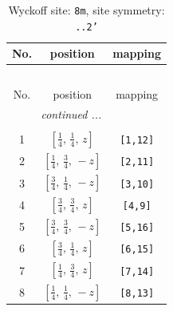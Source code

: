 \documentclass[fleqn,8pt]{jsarticle}
\begin{document}
\renewcommand{\arraystretch}{1.2}
\begin{longtable}{ccc}
\caption{Wyckoff site: {\tt 8m}, site symmetry: {\tt ..2'}}
 \\
 \hline \hline
No. & position & mapping \\ \hline \endfirsthead

\multicolumn{2}{l}{\tablename\ \thetable{}} \\
 \hline \hline
No. & position & mapping \\ \hline \endhead

 \hline \hline
\multicolumn{2}{r}{\footnotesize\it continued ...} \\ \endfoot

 \hline \hline
\multicolumn{2}{r}{} \\ \endlastfoot

1 & $\left[ \frac{1}{4},\, \frac{1}{4},\, z \right]$ & {\tt [1,12]} \\ \hline
2 & $\left[ \frac{1}{4},\, \frac{3}{4},\, - z \right]$ & {\tt [2,11]} \\ \hline
3 & $\left[ \frac{3}{4},\, \frac{1}{4},\, - z \right]$ & {\tt [3,10]} \\ \hline
4 & $\left[ \frac{3}{4},\, \frac{3}{4},\, z \right]$ & {\tt [4,9]} \\ \hline
5 & $\left[ \frac{3}{4},\, \frac{3}{4},\, - z \right]$ & {\tt [5,16]} \\ \hline
6 & $\left[ \frac{3}{4},\, \frac{1}{4},\, z \right]$ & {\tt [6,15]} \\ \hline
7 & $\left[ \frac{1}{4},\, \frac{3}{4},\, z \right]$ & {\tt [7,14]} \\ \hline
8 & $\left[ \frac{1}{4},\, \frac{1}{4},\, - z \right]$ & {\tt [8,13]} \\
\end{longtable}
\renewcommand{\arraystretch}{1.2}
\end{document}
